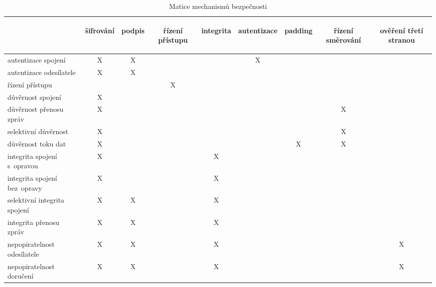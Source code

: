 \begin{table}[ht]
	\centering
	\onehalfspacing

	\begin{tabular}{|l|cccccccc|}
		&
		\begin{sideways}šifrování\end{sideways} &
		\begin{sideways}podpis\end{sideways} &
		\begin{sideways}řízení přístupu\end{sideways} &
		\begin{sideways}integrita\end{sideways} &
		\begin{sideways}autentizace\end{sideways} &
		\begin{sideways}padding\end{sideways} &
		\begin{sideways}řízení směrování\end{sideways} &
		\begin{sideways}ověření třetí stranou\end{sideways} \\
		\hline\hline
		autentizace spojení          & X & X &   &   & X &   &   &   \\
		autentizace odesílatele      & X & X &   &   &   &   &   &   \\
		řízení přístupu              &   &   & X &   &   &   &   &   \\
		důvěrnost spojení            & X &   &   &   &   &   &   &   \\
		důvěrnost přenosu zpráv      & X &   &   &   &   &   & X &   \\
		selektivní důvěrnost         & X &   &   &   &   &   & X &   \\
		důvěrnost toku dat           & X &   &   &   &   & X & X &   \\
		integrita spojení s~opravou  & X &   &   & X &   &   &   &   \\
		integrita spojení bez~opravy & X &   &   & X &   &   &   &   \\
		selektivní integrita spojení & X & X &   & X &   &   &   &   \\
		integrita přenosu zpráv      & X & X &   & X &   &   &   &   \\
		nepopiratelnost odesílatele  & X & X &   & X &   &   &   & X \\
		nepopiratelnost doručení     & X & X &   & X &   &   &   & X \\
	\end{tabular}

	\caption{Matice mechanismů bezpečnosti}
\end{table}


